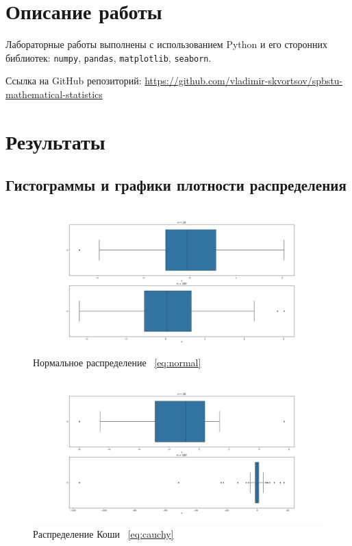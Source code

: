 \documentclass[12pt,a4paper]{article}
\begin{document}
	\section{Описание работы}

	Лабораторные работы выполнены с использованием Python и его сторонних библиотек: \verb!numpy!, \verb!pandas!, \verb!matplotlib!, \verb!seaborn!.

	Ссылка на GitHub репозиторий: \href{https://github.com/vladimir-skvortsov/spbstu-mathematical-statistics}{https://github.com/vladimir-skvortsov/spbstu-mathematical-statistics}

	\newpage

	\section{Результаты}

	\subsection{Гистограммы и графики плотности распределения}

	\begin{figure}[htbp!]
		\begin{center}
			\includegraphics[width = 1.12\linewidth]{graphics/lab2_normal.png}
			\caption{Нормальное распределение \ \eqref{eq:normal}}
		\end{center}
	\end{figure}

	\begin{figure}[htbp!]
		\begin{center}
			\includegraphics[width = 1.12\linewidth]{graphics/lab2_cauchy.png}
			\caption{Распределение Коши \ \eqref{eq:cauchy}}
		\end{center}
	\end{figure}
\end{document}
